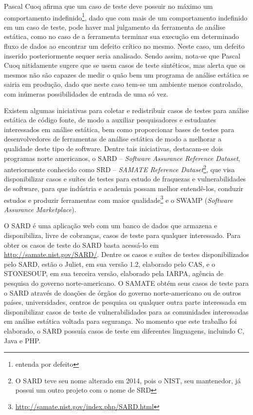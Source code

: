   Pascal Cuoq \cite{pascal} afirma que um caso de teste deve possuir no máximo um comportamento indefinido\footnote{entenda por defeito}, dado que com mais de um comportamento indefinido em um caso de teste, pode haver mal julgamento da ferramenta de análise estática, como no caso de a ferramenta terminar sua execução em determinado fluxo de dados ao encontrar um defeito crítico no mesmo. Neste caso, um defeito inserido posteriormente sequer seria analisado. Sendo assim, nota-se que Pascal Cuoq nitidamente sugere que se usem casos de teste sintéticos, mas alerta que os mesmos não são capazes de medir o quão bem um programa de análise estática se sairia em produção, dado que neste caso tem-se um ambiente menos controlado, com inúmeras possibilidades de entrada de uma só vez.

  Existem algumas iniciativas para coletar e redistribuir casos de testes para análise estática de código fonte, de modo a auxiliar pesquisadores e estudantes interessados em análise estática, bem como proporcionar bases de testes para desenvolvedores de ferramentas de análise estática de modo a melhorar a qualidade deste tipo de software. Dentre tais iniciativas, destacam-se dois programas norte americanos, o SARD  – \textit{Software Assurance Reference Dataset}, anteriormente conhecido como SRD – \textit{SAMATE Reference Dataset}\footnote{O SARD teve seu nome alterado em 2014, pois o NIST, seu mantenedor, já possui um outro projeto com o nome de SRD}, que visa disponibilizar casos e suítes de testes para estudo de fraquezas e vulnerabilidades de software, para que indústria e academia possam melhor entendê-los, conduzir estudos e produzir ferramentas com maior qualidade\footnote{\url{http://samate.nist.gov/index.php/SARD.html}} e o SWAMP (\textit{Software Assurance Marketplace}).

  O SARD é uma aplicação web com um banco de dados que armazena e disponibiliza, livre de cobranças, casos de teste para qualquer interessado. Para obter os casos de teste do SARD basta acessá-lo em \url{http://samate.nist.gov/SARD/}. Dentre os casos e suítes de testes disponibilizados pelo SARD, estão o Juliet, em sua versão 1.2, elaborado pelo CAS, e o STONESOUP, em sua terceira versão, elaborado pela IARPA, agência de pesquisa do governo norte-americano. O SAMATE obtém seus casos de teste para o SARD através de doações de órgãos do governo norte-americano ou de outros países, universidades, centros de pesquisa ou qualquer outra parte interessada em disponibilizar casos de teste de vulnerabilidades para as comunidades interessadas em análise estática voltada para segurança. No momento que este trabalho foi elaborado, o SARD possuía casos de teste em diferentes linguagens, incluindo C, Java e PHP.

